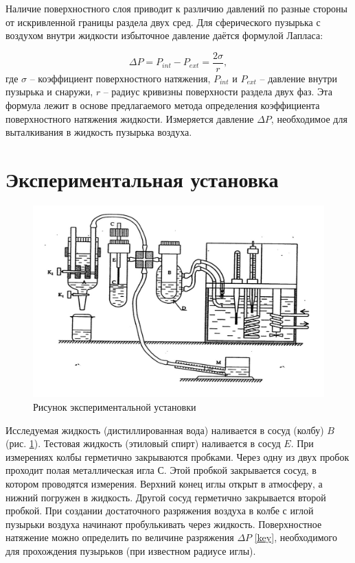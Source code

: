 \documentclass[a4paper,12pt]{article} %
\begin{document}
Наличие поверхностного слоя приводит к различию давлений по разные стороны от искривленной границы раздела двух сред.  Для сферического пузырька с воздухом  внутри жидкости избыточное давление даётся формулой Лапласа:

\begin{equation}\label{key}
\Delta P = P_{int} - P_{ext} = \frac{2\sigma}{r},
\end{equation}
где $ \sigma $ -- коэффициент поверхностного натяжения, $ P_{int} $ и $ P_{ext} $ -- давление внутри пузырька и снаружи, $ r $ -- радиус кривизны поверхности раздела двух фаз. Эта формула лежит в основе предлагаемого метода определения коэффициента поверхностного натяжения жидкости. Измеряется давление $ \Delta P $, необходимое для выталкивания в жидкость пузырька воздуха.

\section{Экспериментальная установка}

\begin{figure}[H]
	\begin{center}
		\includegraphics[width=15cm]{ust.jpg}
		\caption{Рисунок экспериментальной установки}\label{img:ust}
	\end{center}
\end{figure}

Исследуемая жидкость (дистиллированная вода) наливается в сосуд (колбу) $ B $ (рис. \ref{img:ust}). Тестовая жидкость  (этиловый спирт) наливается  в сосуд $ E $.  При измерениях  колбы герметично закрываются  пробками. Через одну из двух пробок  проходит полая металлическая игла $ С $. Этой пробкой закрывается сосуд, в котором  проводятся измерения. Верхний конец иглы открыт в атмосферу, а нижний погружен в жидкость. Другой сосуд герметично закрывается второй пробкой. При создании достаточного  разряжения воздуха в колбе с иглой пузырьки воздуха начинают пробулькивать через жидкость. Поверхностное натяжение можно определить по величине разряжения $ \Delta P $ \eqref{key}, необходимого для прохождения пузырьков (при известном радиусе иглы).
\end{document}
